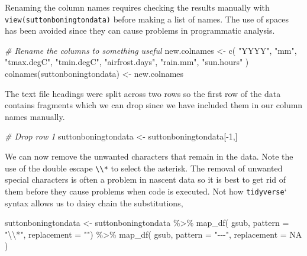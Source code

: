 \documentclass{article}
\newenvironment{Shaded}{\begin{snugshade}}{\end{snugshade}}
\newcommand{\AttributeTok}[1]{\textcolor[rgb]{0.77,0.63,0.00}{#1}}
\newcommand{\CommentTok}[1]{\textcolor[rgb]{0.56,0.35,0.01}{\textit{#1}}}
\newcommand{\ConstantTok}[1]{\textcolor[rgb]{0.00,0.00,0.00}{#1}}
\newcommand{\DecValTok}[1]{\textcolor[rgb]{0.00,0.00,0.81}{#1}}
\newcommand{\FunctionTok}[1]{\textcolor[rgb]{0.00,0.00,0.00}{#1}}
\newcommand{\NormalTok}[1]{#1}
\newcommand{\OtherTok}[1]{\textcolor[rgb]{0.56,0.35,0.01}{#1}}
\newcommand{\SpecialCharTok}[1]{\textcolor[rgb]{0.00,0.00,0.00}{#1}}
\newcommand{\StringTok}[1]{\textcolor[rgb]{0.31,0.60,0.02}{#1}}
\begin{document}
Renaming the column names requires checking the results manually with \texttt{view(suttonboningtondata)} before making a list of names. The use of spaces has been avoided since they can cause problems in programmatic analysis.

\begin{Shaded}
\begin{Highlighting}[]
\CommentTok{\# Rename the columns to something useful}
\NormalTok{new.colnames }\OtherTok{\textless{}{-}} \FunctionTok{c}\NormalTok{( }\StringTok{"YYYY"}\NormalTok{,}
                   \StringTok{"mm"}\NormalTok{,}
                   \StringTok{"tmax.degC"}\NormalTok{,}
                   \StringTok{"tmin.degC"}\NormalTok{,}
                   \StringTok{"airfrost.days"}\NormalTok{,}
                   \StringTok{"rain.mm"}\NormalTok{,}
                   \StringTok{"sun.hours"}
\NormalTok{  )}
\FunctionTok{colnames}\NormalTok{(suttonboningtondata) }\OtherTok{\textless{}{-}}\NormalTok{ new.colnames}
\end{Highlighting}
\end{Shaded}

The text file headings were split across two rows so the first row of the data contains fragments which we can drop since we have included them in our column names manually.

\begin{Shaded}
\begin{Highlighting}[]
\CommentTok{\# Drop row 1}
\NormalTok{suttonboningtondata }\OtherTok{\textless{}{-}}\NormalTok{ suttonboningtondata[}\SpecialCharTok{{-}}\DecValTok{1}\NormalTok{,]}
\end{Highlighting}
\end{Shaded}

We can now remove the unwanted characters that remain in the data. Note the use of the double escape \texttt{\textbackslash{}\textbackslash{}*} to select the asterisk. The removal of unwanted special characters is often a problem in nascent data so it is best to get rid of them before they cause problems when code is executed. Not how \texttt{tidyverse}` syntax allows us to daisy chain the substitutions,

\begin{Shaded}
\begin{Highlighting}[]
\NormalTok{suttonboningtondata }\OtherTok{\textless{}{-}}\NormalTok{ suttonboningtondata }\SpecialCharTok{\%\textgreater{}\%}
                        \FunctionTok{map\_df}\NormalTok{( gsub,}
                                \AttributeTok{pattern =} \StringTok{"}\SpecialCharTok{\textbackslash{}\textbackslash{}}\StringTok{*"}\NormalTok{,}
                                \AttributeTok{replacement =} \StringTok{""}\NormalTok{) }\SpecialCharTok{\%\textgreater{}\%}
                        \FunctionTok{map\_df}\NormalTok{( gsub,}
                                \AttributeTok{pattern =} \StringTok{"{-}{-}{-}"}\NormalTok{,}
                                \AttributeTok{replacement =} \ConstantTok{NA}
\NormalTok{                                )}
\end{Highlighting}
\end{Shaded}
\end{document}

